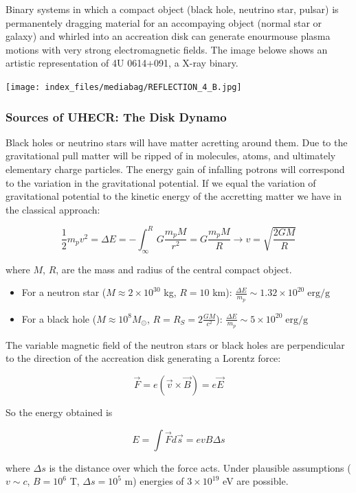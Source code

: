 \documentclass[
  letterpaper,
  DIV=11,
  numbers=noendperiod]{scrreprt}
\begin{document}
Binary systems in which a compact object (black hole, neutrino star,
pulsar) is permanentely dragging material for an accompaying object
(normal star or galaxy) and whirled into an accreation disk can generate
enourmouse plasma motions with very strong electromagnetic fields. The
image belowe shows an artistic representation of 4U 0614+091, a X-ray
binary.

\texttt{[image: index\_files/mediabag/REFLECTION\_4\_B.jpg]}

\subsubsection*{Sources of UHECR: The Disk
Dynamo}\label{sources-of-uhecr-the-disk-dynamo}

Black holes or neutrino stars will have matter acretting around them.
Due to the gravitational pull matter will be ripped of in molecules,
atoms, and ultimately elementary charge particles. The energy gain of
infalling potrons will correspond to the variation in the gravitational
potential. If we equal the variation of gravitational potential to the
kinetic energy of the accretting matter we have in the classical
approach:

\[\frac{1}{2}m_p v^2 = \Delta E = -\int^{R}_\infty G\frac{m_p M}{r^2} = G\frac{m_p M}{R}  \rightarrow v =\sqrt{\frac{2 GM}{R}}\]

where \(M\), \(R\), are the mass and radius of the central compact
object.

\begin{itemize}
\item
  For a neutron star (\(M\approx 2\times10^{30}\) kg, \(R= 10\) km):
  \(\frac{\Delta E}{m_p} \sim 1.32\times 10^{20} \;\mathrm{erg/g}\)
\item
  For a black hole (\(M\approx 10^8 M_\odot\),
  \(R = R_S = 2\frac{GM}{c^2}\)):
  \(\frac{\Delta E}{m_p} \sim 5 \times 10^{20} \;\mathrm{erg/g}\)
\end{itemize}

The variable magnetic field of the neutron stars or black holes are
perpendicular to the direction of the accreation disk generating a
Lorentz force:

\[\vec{F} = e (\vec{v} \times \vec{B}) = e\vec{E}\]

So the energy obtained is

\[E=\int \vec{F}d\vec{s} = e v B\Delta s\]

where \(\Delta s\) is the distance over which the force acts. Under
plausible assumptions (\(v \sim c\), \(B= 10^6\) T, \(\Delta s = 10^5\)
m) energies of \(3\times 10^{19}\) eV are possible.
\end{document}
